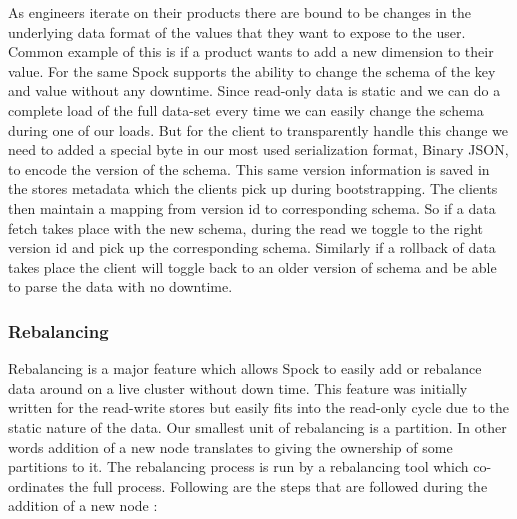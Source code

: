 \documentclass[twocolumn]{article}
\newcommand{\projectname}{Spock}
\begin{document}
As engineers iterate on their products there are bound to be changes in the underlying data format of the values that they want to expose to the user. Common example of this is if a product wants to add a new dimension to their value. For the same \projectname{} supports the ability to change the schema of the key and value without any downtime. Since read-only data is static and we can do a complete load of the full data-set every time we can easily change the schema during one of our loads. But for the client to transparently handle this change we need to added a special byte in our most used serialization format, Binary JSON, to encode the version of the schema. This same version information is saved in the stores metadata which the clients pick up during bootstrapping. The clients then maintain a mapping from version id to corresponding schema. So if a data fetch takes place with the new schema, during the read we toggle to the right version id and pick up the corresponding schema. Similarly if a rollback of data takes place the client will toggle back to an older version of schema and be able to parse the data with no downtime. 


\subsubsection{Rebalancing}
\label{sec:read_only:data_cycle:rebalancing}

Rebalancing is a major feature which allows \projectname{} to easily add or rebalance data around on a live cluster without down time. This feature was initially written for the read-write stores but easily fits into the read-only cycle due to the static nature of the data. Our smallest unit of rebalancing is a partition. In other words addition of a new node translates to giving the ownership of some partitions to it. The rebalancing process is run by a rebalancing tool which co-ordinates the full process. Following are the steps that are followed during the addition of a new node :
\end{document}
